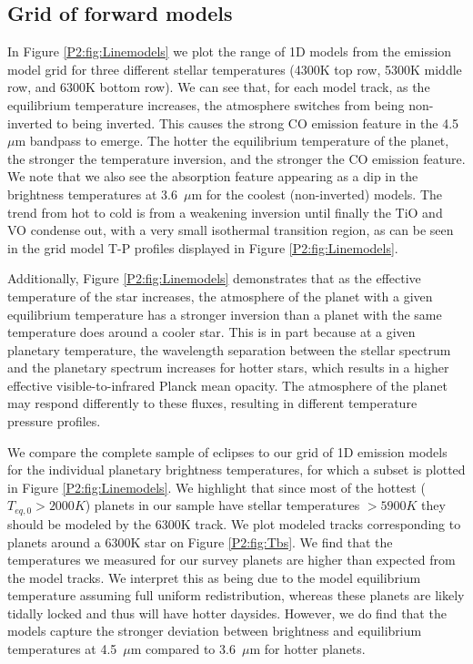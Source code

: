 \subsection{Grid of forward models}
\label{P2:sec:modeldiscussion}

In Figure \ref{P2:fig:Linemodels} we plot the range of 1D models from the emission model grid for three different stellar temperatures  (4300K top row, 5300K middle row, and 6300K bottom row). We can see that, for each model track, as the equilibrium temperature increases, the atmosphere switches from being non-inverted to being inverted. This causes the strong CO emission feature in the 4.5~$\mu$m bandpass to emerge. The hotter the equilibrium temperature of the planet, the stronger the temperature inversion, and the stronger the CO emission feature. We note that we also see the  absorption feature appearing as a dip in the brightness temperatures at 3.6~$\mu$m for the coolest (non-inverted) models. The trend from hot to cold is from a weakening inversion until finally the TiO and VO condense out, with a very small isothermal transition region, as can be seen in the grid model T-P profiles displayed in Figure \ref{P2:fig:Linemodels}.

Additionally, Figure \ref{P2:fig:Linemodels} demonstrates that as the effective temperature of the star increases, the atmosphere of the planet with a given equilibrium temperature has a stronger inversion than a planet with the same temperature does around a cooler star. This is in part because at a given planetary temperature, the wavelength separation between the stellar spectrum and the planetary spectrum increases for hotter stars, which results in a higher effective visible-to-infrared Planck mean opacity. The atmosphere of the planet may respond differently to these fluxes, resulting in different temperature pressure profiles.

We compare the complete sample of eclipses to our grid of 1D emission models for the individual planetary brightness temperatures, for which a subset is plotted in  Figure \ref{P2:fig:Linemodels}. We highlight that since most of the hottest ($T_{eq,\textit{0}}>2000K$) planets in our sample have stellar temperatures $>5900K$ they should be modeled by the 6300K track.
We plot modeled tracks corresponding to planets around a 6300K star on Figure \ref{P2:fig:Tbs}. We find that the temperatures we measured for our survey planets are higher than expected from the model tracks. We interpret this as being due to the model equilibrium temperature assuming full uniform redistribution, whereas these planets are likely tidally locked and thus will have hotter daysides. However, we do find that the models capture the stronger deviation between brightness and equilibrium temperatures at 4.5~$\mu$m compared to 3.6~$\mu$m for hotter planets.

